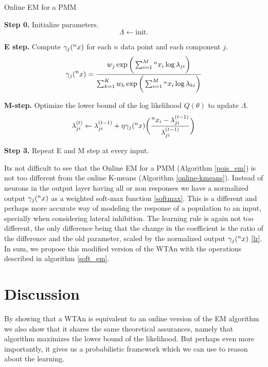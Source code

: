 \documentclass{article}
\begin{document}
\begin{algorithm}
\caption{Online EM for a PMM} \label{pois_em}
\begin{algorithmic}
\State \textbf{Step 0.} Initialize parameters.
$$
\Lambda \leftarrow \text{init.}
$$

\State \textbf{E step.} Compute $\gamma_j(\prescript{n}{}{x})$ for each \(n\) data point and each component \(j\).
$$
\gamma_j(\prescript{n}{}{x}) = \frac{w_j \exp{\bigg(\sum_{i=1}^M \prescript{n}{}{x_i}\log\lambda_{ji}} \bigg)}{\sum_{k=1}^K w_k \exp{\bigg(\sum_{i=1}^M \prescript{n}{}{x_i}\log\lambda_{ki}\bigg)}}
$$

\State \textbf{M-step.} Optimize the lower bound of the log likelihood $Q(\theta)$ to update $\Lambda$.
$$
\lambda_{ji}^{(t)} \leftarrow  \lambda_{ji}^{(t-1)} + \eta \gamma_j(\prescript{n}{}{x}) \bigg( \frac{\prescript{n}{}{x_i} - \lambda_{ji}^{(t-1)}}{\lambda_{ji}^{(t-1)}} \bigg)
$$

\State \textbf{Step 3.} Repeat E and M step at every input.

\end{algorithmic}
\end{algorithm}


Its not difficult to see that the Online EM for a PMM (Algorithm \ref{pois_em}) is not too different from the online K-means (Algorithm \ref{online-kmeans}). Instead of neurons in the output layer having all or non responses we have a normalized output $\gamma_j(\prescript{n}{}{x})$ as a weighted soft-max function \eqref{softmax}. This is a different and perhaps more accurate way of modeling the response of a population to an input, specially when considering lateral inhibition. The learning rule is again not too different, the only difference being that the change in the coefficient is the ratio of the difference and the old parameter, scaled by the normalized output $\gamma_j(\prescript{n}{}{x})$ \eqref{lr}. In sum, we propose this modified version of the WTAn with the operations described in algorithm \ref{soft_em}.

\section{Discussion}
By showing that a WTAn is equivalent to an online
version of the EM algorithm we also show that it shares the same
theoretical assurances, namely that algorithm maximizes the lower bound
of the likelihood. But perhaps even more importantly, it gives us a
probabilistic framework which we can use to reason about the learning.
\end{document}
